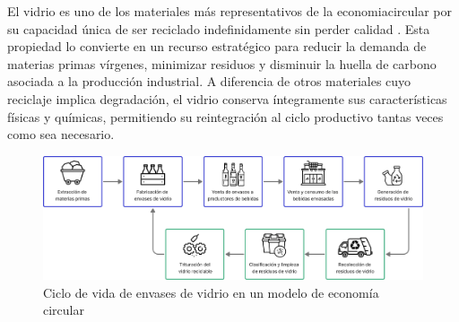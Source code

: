 El vidrio es uno de los materiales más representativos de la \gls{economiacircular} por su capacidad única de ser reciclado indefinidamente sin perder calidad \cite{verallia2022whitebook}. Esta propiedad lo convierte en un recurso estratégico para reducir la demanda de materias primas vírgenes, minimizar residuos y disminuir la huella de carbono asociada a la producción industrial. A diferencia de otros materiales cuyo reciclaje implica degradación, el vidrio conserva íntegramente sus características físicas y químicas, permitiendo su reintegración al ciclo productivo tantas veces como sea necesario.

\begin{figure}[!b]
    \centering
    \includegraphics[width=\textwidth]{Figures/glass-lifecycle.png}
    \caption{Ciclo de vida de envases de vidrio en un modelo de economía circular}
    \label{fig:glass-lifecycle}
\end{figure}

